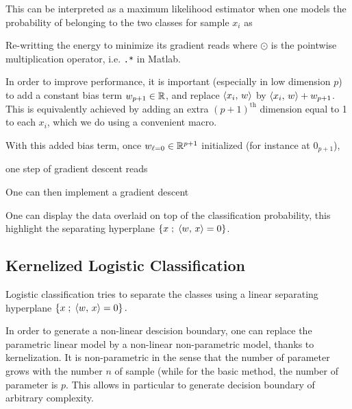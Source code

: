 
This can be interpreted as a maximum likelihood estimator when one
models the probability of  belonging to the two classes for sample $x_i$ as

Re-writting the energy to minimize
its gradient reads
where $\odot$ is the pointwise multiplication operator, i.e. \texttt{.*} in
Matlab.


In order to improve performance, it is important (especially
in low dimension $p$) to add a constant bias term $w_{p+1} \in \mathbb{R}$, and replace $\langle x_i,\,w\rangle$
by $ \langle x_i,\,w\rangle + w_{p+1} $.  This is equivalently achieved by
adding an extra $(p+1)^{\text{th}}$ dimension equal to 1 to each
$x_i$, which we do using a convenient macro.

With this added bias term, once $w_{\ell=0} \in \mathbb{R}^{p+1}$ initialized
(for instance at $0_{p+1}$),

one step of gradient descent reads

One can then implement a gradient descent


One can display the data overlaid on top of the
classification probability, this highlight the
separating hyperplane $ \left\{ x \;;\; \langle w,\,x\rangle=0 \right\} $.




\subsection{Kernelized Logistic Classification}

Logistic classification tries to separate the classes using
a linear separating hyperplane $ \left\{ x \;;\; \langle w,\,x\rangle=0 \right\}. $

In order to generate a non-linear descision boundary, one can replace the
parametric linear model by a non-linear non-parametric model, thanks to
kernelization. It is non-parametric in the sense that the number of
parameter grows with the number $n$ of sample (while for the basic
method, the number of parameter is $p$. This allows in particular to
generate decision boundary of arbitrary complexity.

